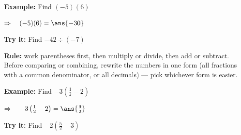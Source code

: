 \documentclass[12pt]{article}
\begin{document}
\begin{examplebox}
\textbf{Example:} \quad Find $(-5)(6)$

$\Rightarrow\quad (-5)(6) = \ans{-30}$
\end{examplebox}

\begin{tryitbox}
\textbf{Try it:} \quad Find $-42 \div (-7)$\\[2pt]
\end{tryitbox}


\begin{formulabox}
\textbf{Rule:} work parentheses first, then multiply or divide, then add or subtract.
Before comparing or combining, rewrite the numbers in one form (all fractions with a
common denominator, or all decimals) --- pick whichever form is easier.
\end{formulabox}

\begin{examplebox}
\textbf{Example:} \quad Find $-3\left(\tfrac{1}{2} - 2\right)$

$\Rightarrow\quad -3\left(\tfrac{1}{2} - 2\right) = \ans{\tfrac{9}{2}}$
\end{examplebox}

\begin{tryitbox}
\textbf{Try it:} \quad Find $-2\left(\tfrac{5}{2} - 3\right)$\\[2pt]
\end{tryitbox}
\end{document}
